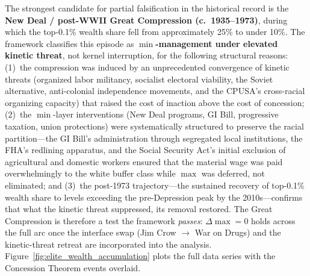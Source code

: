 The strongest candidate for partial falsification in the historical record is the \textbf{New Deal / post-WWII Great Compression (c.\ 1935--1973)}, during which the top-0.1\% wealth share fell from approximately 25\% to under 10\%. The framework classifies this episode as \textbf{$\min$-management under elevated kinetic threat}, not kernel interruption, for the following structural reasons: (1)~the compression was induced by an unprecedented convergence of kinetic threats (organized labor militancy, socialist electoral viability, the Soviet alternative, anti-colonial independence movements, and the CPUSA's cross-racial organizing capacity) that raised the cost of inaction above the cost of concession; (2)~the $\min$-layer interventions (New Deal programs, GI Bill, progressive taxation, union protections) were systematically structured to preserve the racial partition---the GI Bill's administration through segregated local institutions, the FHA's redlining apparatus, and the Social Security Act's initial exclusion of agricultural and domestic workers ensured that the material wage was paid overwhelmingly to the white buffer class while $\max$ was deferred, not eliminated; and (3)~the post-1973 trajectory---the sustained recovery of top-0.1\% wealth share to levels exceeding the pre-Depression peak by the 2010s---confirms that what the kinetic threat suppressed, its removal restored. The Great Compression is therefore a test the framework \textit{passes}: $\Delta\max = 0$ holds across the full arc once the interface swap (Jim Crow $\rightarrow$ War on Drugs) and the kinetic-threat retreat are incorporated into the analysis. Figure~\ref{fig:elite_wealth_accumulation} plots the full data series with the Concession Theorem events overlaid.

